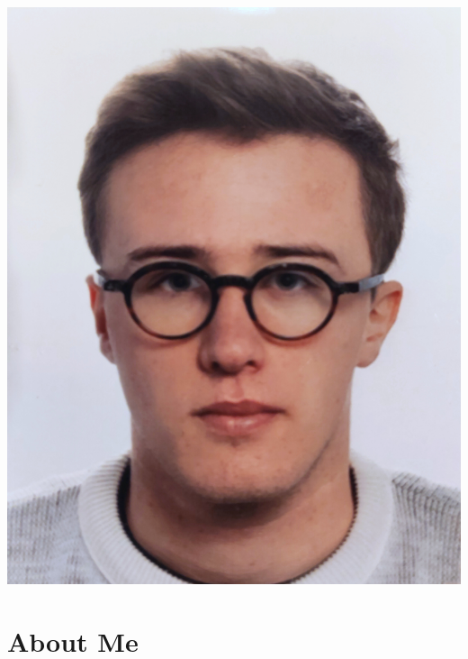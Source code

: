 \documentclass[10pt,a4paper]{article}
\begin{document}
\begin{minipage}[b]{.29\linewidth}
	\includegraphics[width=\linewidth]{photo.jpg}
\end{minipage}


\section*{About Me}

\end{document}
